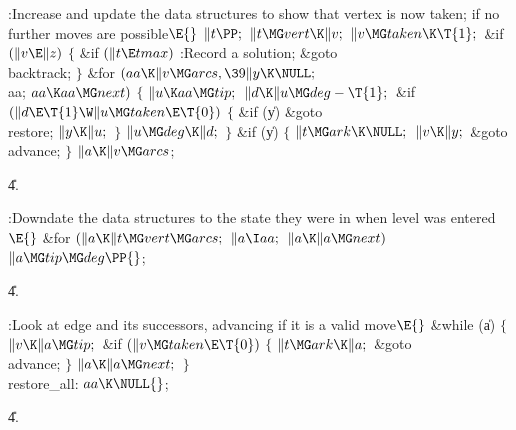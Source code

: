 \B{}:Increase  and update the data structures to show that vertex
 is now taken;  if no further moves are
possible\X${}\E{}$\6
$\|t\PP;{}$\6
${}\|t\MG\\{vert}\K\|v;{}$\6
${}\|v\MG\\{taken}\K\T{1};{}$\6
\&{if} ${}(\|v\E\|z){}$\5
${}\{{}$\1\6
\&{if} ${}(\|t\E\\{tmax}){}$\1\5
:Record a solution\X;\2\6
\&{goto} \\{backtrack};\6
\4${}\}{}$\2\6
\&{for} ${}(\\{aa}\K\|v\MG\\{arcs},\39\|y\K\NULL;{}$ \\{aa}; ${}\\{aa}\K\\{aa}%
\MG\\{next}){}$\5
${}\{{}$\1\6
${}\|u\K\\{aa}\MG\\{tip};{}$\6
${}\|d\K\|u\MG\\{deg}-\T{1};{}$\6
\&{if} ${}(\|d\E\T{1}\W\|u\MG\\{taken}\E\T{0}){}$\5
${}\{{}$\1\6
\&{if} (\|y)\1\5
\&{goto} \\{restore};\2\6
${}\|y\K\|u;{}$\6
\4${}\}{}$\2\6
${}\|u\MG\\{deg}\K\|d;{}$\6
\4${}\}{}$\2\6
\&{if} (\|y)\5
${}\{{}$\1\6
${}\|t\MG\\{ark}\K\NULL;{}$\6
${}\|v\K\|y;{}$\6
\&{goto} \\{advance};\6
\4${}\}{}$\2\6
${}\|a\K\|v\MG\\{arcs}{}$;\par
\U4.\fi

\B{}:Downdate the data structures to the state they were in when level %
 was entered\X${}\E{}$\6
\&{for} ${}(\|a\K\|t\MG\\{vert}\MG\\{arcs};{}$ ${}\|a\I\\{aa};{}$ ${}\|a\K\|a%
\MG\\{next}){}$\1\5
${}\|a\MG\\{tip}\MG\\{deg}\PP{}$;\2\par
\U4.\fi

\B{}:Look at edge  and its successors, advancing if it is a valid
move\X${}\E{}$\6
\&{while} (\|a)\5
${}\{{}$\1\6
${}\|v\K\|a\MG\\{tip};{}$\6
\&{if} ${}(\|v\MG\\{taken}\E\T{0}){}$\5
${}\{{}$\1\6
${}\|t\MG\\{ark}\K\|a;{}$\6
\&{goto} \\{advance};\6
\4${}\}{}$\2\6
${}\|a\K\|a\MG\\{next};{}$\6
\4${}\}{}$\2\6
\4\\{restore\_all}:\5
${}\\{aa}\K\NULL{}$;%
\par
\U4.\fi

